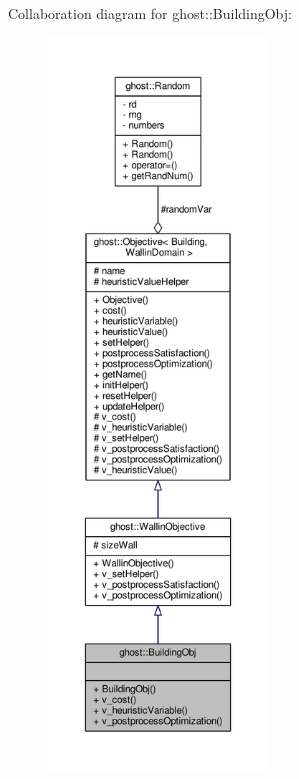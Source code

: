 Collaboration diagram for ghost\-:\-:Building\-Obj\-:\nopagebreak
\begin{figure}[H]
\begin{center}
\leavevmode
\includegraphics[height=550pt]{classghost_1_1BuildingObj__coll__graph}
\end{center}
\end{figure}
